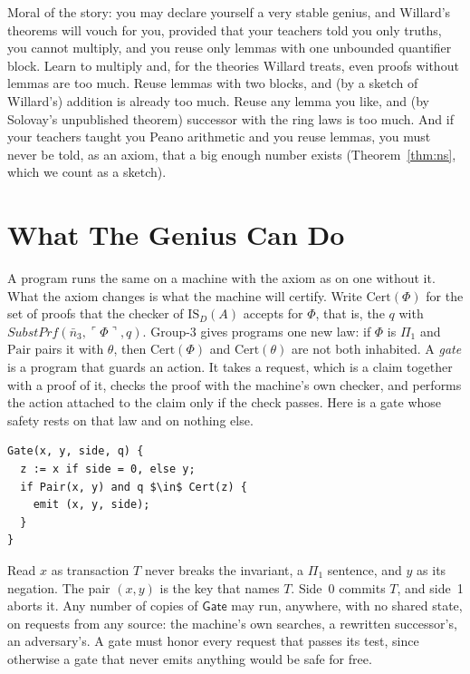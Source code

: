\documentclass[11pt]{article}
\newcommand{\Prog}[1]{\mathsf{#1}}
\newcommand{\fs}[1]{\ifmmode\text{\guillemotleft#1\guillemotright}\else\guillemotleft#1\guillemotright\fi}
\newcommand{\Pair}{\mathrm{Pair}}
\newcommand{\gn}[1]{\ulcorner #1\urcorner}  %
\newcommand{\ISD}{\mathrm{IS}_D(A)}
\theoremstyle{plain}
\theoremstyle{definition}
\begin{document}
\medskip
Moral of the story: you may declare yourself a very stable genius, and
Willard's theorems will vouch for you, provided that your teachers told you
only truths, you cannot multiply, and you reuse only lemmas with one
unbounded quantifier block. Learn to multiply and, for the theories Willard
treats, even proofs without lemmas are too much. Reuse lemmas with two
blocks, and (by a sketch of Willard's) addition is already too much. Reuse
any lemma you like, and (by Solovay's unpublished theorem) successor with the
ring laws is too much. And if your teachers taught you Peano arithmetic and
you reuse lemmas, you must never be told, as an axiom, that a big enough
number exists (Theorem~\ref{thm:ns}, which we count as a sketch).

\section{What The Genius Can Do}
\label{sec:program}

A program runs the same on a machine with the axiom as on one without it.
What the axiom changes is what the machine will certify. Write
$\mathrm{Cert}(\Phi)$ for the set of proofs that the checker of $\ISD$
accepts for $\Phi$, that is, the $q$ with
$\mathit{SubstPrf}(\bar n_3, \gn{\Phi}, q)$. Group-3 gives programs one new
law: if $\Phi$ is $\Pi_1$ and $\Pair$ pairs it with $\theta$, then
$\mathrm{Cert}(\Phi)$ and $\mathrm{Cert}(\theta)$ are not both inhabited.
A \emph{gate} is a program that guards an action. It takes a request, which
is a claim together with a proof of it, checks the proof with the machine's
own checker, and performs the action attached to the claim only if the check
passes. Here is a gate whose safety rests on that law and on nothing else.

\noindent\begin{minipage}{\linewidth}
\begin{lstlisting}
Gate(x, y, side, q) {
  z := x if side = 0, else y;
  if Pair(x, y) and q $\in$ Cert(z) {
    emit (x, y, side);
  }
}
\end{lstlisting}
\end{minipage}
Read $x$ as \fs{transaction $T$ never breaks the invariant}, a $\Pi_1$
sentence, and $y$ as its negation. The pair $(x, y)$ is the key that names
$T$. Side~0 commits $T$, and side~1 aborts it.
Any number of copies of $\Prog{Gate}$ may run, anywhere, with no shared
state, on requests from any source: the machine's own searches, a rewritten
successor's, an adversary's. A gate must honor every request that passes its
test, since otherwise a gate that never emits anything would be safe for
free.
\end{document}
